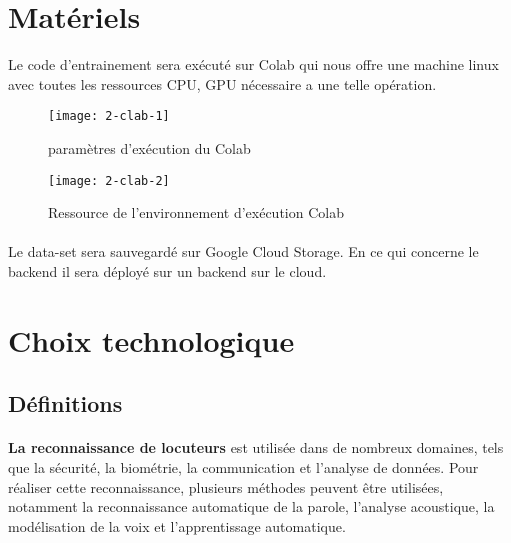 \section{Matériels}
Le code d’entrainement sera exécuté sur Colab qui nous offre une machine linux avec toutes les ressources CPU, GPU nécessaire a une telle opération. 

\begin{figure}[ht]
    \begin{center}
        \centering
        \texttt{[image: 2-clab-1]}
        \caption{paramètres d'exécution du Colab}
        \label{fig:2-clab-1}
    
    \end{center}
\end{figure}


\begin{figure}
    \begin{center}
        \centering
        \texttt{[image: 2-clab-2]}
        \caption{Ressource de l'environnement d'exécution Colab}
        \label{fig:2-clab-2}
        
    \end{center}
\end{figure}




\paragraph{}Le data-set sera sauvegardé sur Google Cloud Storage. En ce qui concerne le backend il sera déployé sur un backend sur le cloud. 

\section{Choix technologique}
\subsection{Définitions }
\paragraph{}\textbf{La reconnaissance de locuteurs}  est utilisée dans de nombreux domaines, tels que la sécurité, la biométrie, la communication et l'analyse de données. Pour réaliser cette reconnaissance, plusieurs méthodes peuvent être utilisées, notamment la reconnaissance automatique de la parole, l'analyse acoustique, la modélisation de la voix et l'apprentissage automatique.
